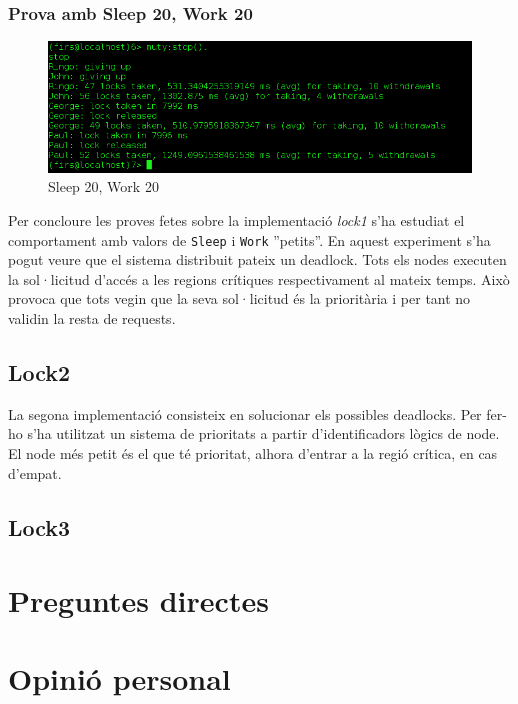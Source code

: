 \documentclass[a4paper, 11pt]{article}
\begin{document}
\subsubsection{Prova amb Sleep 20, Work 20}

\begin{figure}[H]
	\centering
    \includegraphics[width=1.0\textwidth]{figures/20-20lock1}
    \caption{Sleep 20, Work 20 \label{fig:20-20lock1}}    
\end{figure}

Per concloure les proves fetes sobre la implementació \textit{lock1} s'ha
estudiat el comportament amb valors de \texttt{Sleep} i \texttt{Work}
''petits''. En aquest experiment s'ha pogut veure que el sistema distribuit
pateix un deadlock. Tots els nodes executen la sol·licitud d'accés a les regions
crítiques respectivament al mateix temps. Això provoca que tots vegin que la
seva sol·licitud és la prioritària i per tant no validin la resta de requests.

\subsection{Lock2}

La segona implementació consisteix en solucionar els possibles deadlocks. Per
fer-ho s'ha utilitzat un sistema de prioritats a partir d'identificadors lògics
de node. El node més petit és el que té prioritat, alhora d'entrar a la regió
crítica, en cas d'empat. 

\subsection{Lock3}

\section{Preguntes directes}


\section{Opinió personal}
\end{document}

